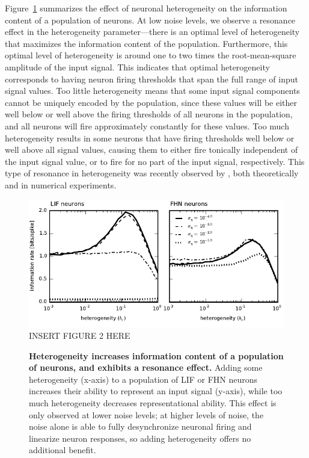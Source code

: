 \documentclass[letterpaper,11pt]{article}
\begin{document}
Figure~\ref{fig:infohetero} summarizes the effect of neuronal heterogeneity on the information content of a population of neurons. At low noise levels, we observe a resonance effect in the heterogeneity parameter---there is an optimal level of heterogeneity that maximizes the information content of the population. Furthermore, this optimal level of heterogeneity is around one to two times the root-mean-square amplitude of the input signal. This indicates that optimal heterogeneity corresponds to having neuron firing thresholds that span the full range of input signal values. Too little heterogeneity means that some input signal components cannot be uniquely encoded by the population, since these values will be either well below or well above the firing thresholds of all neurons in the population, and all neurons will fire approximately constantly for these values. Too much heterogeneity results in some neurons that have firing thresholds well below or well above all signal values, causing them to either fire tonically independent of the input signal value, or to fire for no part of the input signal, respectively. This type of resonance in heterogeneity was recently observed by \cite{Mejias2012}, both theoretically and in numerical experiments.

\begin{figure}
  \ifx\hidefigures\undefined
    \centering
    \includegraphics[width=\textwidth]{figure2_infohetero.pdf}
  \else
    INSERT FIGURE 2 HERE
  \fi
  \caption{
    \textbf{Heterogeneity increases information content of a population of neurons, and exhibits a resonance effect.}
    Adding some heterogeneity (x-axis) to a population of LIF or FHN neurons increases their ability to represent an input signal (y-axis), while too much heterogeneity decreases representational ability. This effect is only observed at lower noise levels; at higher levels of noise, the noise alone is able to fully desynchronize neuronal firing and linearize neuron responses, so adding heterogeneity offers no additional benefit.
  }
  \label{fig:infohetero}
\end{figure}
\end{document}
